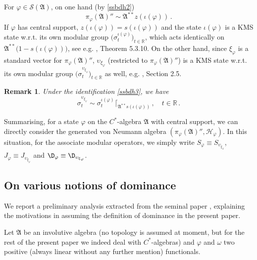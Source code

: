 \documentclass[12pt]{amsart}
\numberwithin{equation}{section}
\def\ch{{\mathcal H}}
\def\cs{{\mathcal S}}
\def\ga{{\mathfrak A}} \def\gpa{{\mathfrak a}}
\def\br{{\mathbb R}}
\def\s{\sigma} \def\S{\Sigma}
\def\f{\varphi}\def\ff{\phi} \def\F{\Phi}
\def\om{\omega} \def\Om{\Omega}
\newtheorem{rem}[thm]{Remark}
\begin{document}
For $\f\in\cs(\ga)$, on one hand (by \eqref{ssbdh2})
\begin{equation}
\label{ssbdh3}
\pi_\f(\ga)''\sim\ga^{**}z(\iota(\f))\,.
\end{equation}
If $\f$ has central support, $z(\iota(\f))=s(\iota(\f))$ and the state $\iota(\f)$ is a KMS state w.r.t. its own modular group 
$\big(\s_t^{\iota(\f)}\big)_{t\in\br}$, which acts identically on $\ga^{**}\big(1-s(\iota(\f))\big)$, see e.g. \cite{BR}, Theorem 5.3.10. On the other hand, since $\xi_\f$ is a standard vector for $\pi_\f(\ga)''$, $\upsilon_{\xi_\f}$ (restricted to $\pi_\f(\ga)''$) is a KMS state w.r.t. its own modular group $\big(\s_t^{\upsilon_{\xi_\f}}\big)_{t\in\br}$ as well, e.g. \cite{BR}, Section 2.5.
\begin{rem}
Under the identification \eqref{ssbdh3}, we have 
$$
\s_t^{\upsilon_{\xi_\f}}\sim\s_t^{\iota(\f)}\lceil_{\ga^{**}s(\iota(\f))}\,,\quad t\in\br\,.
$$
\end{rem}
Summarising, for a state $\f$ on the $C^*$-algebra $\ga$ with central support, we can directly consider the generated von Neumann algebra 
$(\pi_\f(\ga)'',\ch_\f)$. In this situation, for the associate modular operators, we simply  write $S_\f\equiv S_{\upsilon_{\xi_\f}}$, $J_\f\equiv J_{\upsilon_{\xi_\f}}$ and 
$\D_\f\equiv \D_{\upsilon_{\xi_\f}}$.


\subsection{On various notions of dominance} 
\label{nodo}
We report a preliminary analysis extracted from the seminal paper \cite{G}, explaining the motivations in assuming the definition of dominance in the present paper.

Let $\ga$ be an involutive algebra (no topology is assumed at moment, but for the rest of the present paper we indeed deal with $C^*$-algebras) and $\f$ and $\om$ two positive (always linear without any further mention) functionals. 
\end{document}
